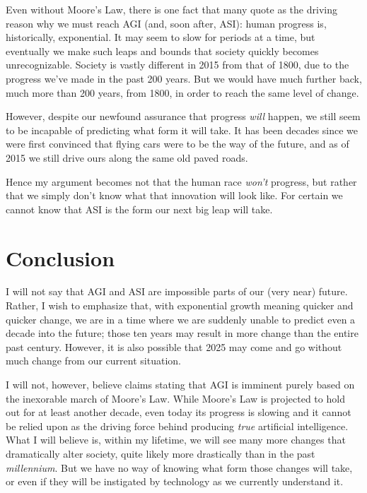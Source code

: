 \documentclass[12pt]{article} %
\begin{document}
Even without Moore's Law, there is one fact that many quote as the driving reason why we must reach AGI (and, soon after, ASI): human progress is, historically, exponential\cite{wbw}. It may seem to slow for periods at a time, but eventually we make such leaps and bounds that society quickly becomes unrecognizable. Society is vastly different in 2015 from that of 1800, due to the progress we've made in the past 200 years. But we would have much further back, much more than 200 years, from 1800, in order to reach the same level of change.

However, despite our newfound assurance that progress \textit{will} happen, we still seem to be incapable of predicting what form it will take. It has been decades since we were first convinced that flying cars were to be the way of the future, and as of 2015 we still drive ours along the same old paved roads.

Hence my argument becomes not that the human race \textit{won't} progress, but rather that we simply don't know what that innovation will look like. For certain we cannot know that ASI is the form our next big leap will take.


\section{Conclusion} %

I will not say that AGI and ASI are impossible parts of our (very near) future. Rather, I wish to emphasize that, with exponential growth meaning quicker and quicker change, we are in a time where we are suddenly unable to predict even a decade into the future; those ten years may result in more change than the entire past century. However, it is also possible that 2025 may come and go without much change from our current situation.

I will not, however, believe claims stating that AGI is imminent purely based on the inexorable march of Moore's Law. While Moore's Law is projected to hold out for at least another decade, even today its progress is slowing and it cannot be relied upon as the driving force behind producing \textit{true} artificial intelligence. What I will believe is, within my lifetime, we will see many more changes that dramatically alter society, quite likely more drastically than in the past \textit{millennium}. But we have no way of knowing what form those changes will take, or even if they will be instigated by technology as we currently understand it.
\end{document}
